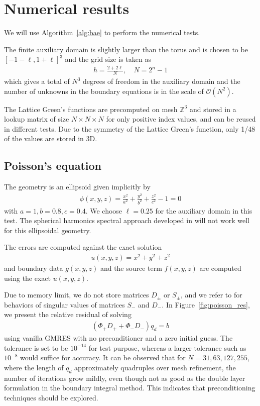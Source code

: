 \section{Numerical results}\label{sec:numerical_results}
We will use Algorithm~\ref{alg:bae} to perform the numerical tests.

The finite auxiliary domain is slightly larger than the torus and is chosen to be $[-1-\ell,1+\ell]^3$ and the grid size is taken as
\begin{align}
h = \frac{2+2\ell}{N},\quad N = 2^n-1
\end{align}
which gives a total of $N^3$ degrees of freedom in the auxiliary domain and the number of unknowns in the boundary equations is in the scale of $\mathcal{O}(N^2)$.

The Lattice Green's functions are precomputed on mesh $\mathbb{Z}^3$ and stored in a lookup matrix of size $N\times N\times N$ for only positive index values, and can be reused in different tests. Due to the symmetry of the Lattice Green's function, only 1/48 of the values are stored in 3D.

\subsection{Poisson's equation}
The geometry is an ellipsoid given implicitly by
\begin{align}
\phi(x,y,z) = \frac{x^2}{a^2}+\frac{y^2}{b^2}+\frac{z^2}{c^2}-1=0
\end{align}
with $a=1,b=0.8,c=0.4$. We choose $\ell=0.25$ for the auxiliary domain in this test. The spherical harmonics spectral approach developed in \cite{epshteyn2019efficient} will not work well for this ellipsoidal geometry.

The errors are computed against the exact solution
\begin{align}
u(x,y,z) = x^2+y^2+z^2
\end{align}
and boundary data $g(x,y,z)$ and the source term $f(x,y,z)$ are computed using the exact $u(x,y,z)$.

Due to memory limit, we do not store matrices $D_{\pm}$ or $S_\pm$, and we refer to \cite{martinsson2009boundary} for behaviors of singular values of matrices $S_-$ and $D_-$. In Figure~\ref{fig:poisson_res}, we present the relative residual of solving 
\begin{align}
(\Phi_+D_+ + \Phi_-D_-) q_d = b
\end{align}
using vanilla GMRES with no preconditioner and a zero initial guess. The tolerance is set to be $10^{-14}$ for test purpose, whereas a larger tolerance such as $10^{-8}$ would suffice for accuracy. It can be observed that for $N=31,63,127,255$, where the length of $q_d$ approximately quadruples over mesh refinement, the number of iterations grow mildly, even though not as good as the double layer formulation in the boundary integral method. This indicates that preconditioning techniques should be explored.


